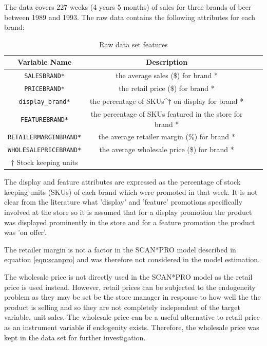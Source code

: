 \documentclass[a4paper,11pt]{article}
\begin{document}
The data covers 227 weeks (4 years 5 months) of sales for three brands of beer between 1989 and 1993. The raw data contains the following attributes for each brand:

\begin{table}[htb]
 \centering
 \caption{Raw data set features}\label{tab:data_features}
 \begin{tabular}{cccc}
 \toprule
  Variable Name & Description \\
  \midrule
  \texttt{SALESBRAND*}& the average sales (\$) for brand * \\
  \texttt{PRICEBRAND*}	& the retail price (\$) for brand * \\
  \texttt{display\_brand*}	& the percentage of SKUs^{$\dagger$} on display for brand * \\
  \texttt{FEATUREBRAND*}	& the percentage of SKUs featured in the store for brand * \\
  \texttt{RETAILERMARGINBRAND*} & the average retailer margin (\%) for brand * \\
  \texttt{WHOLESALEPRICEBRAND*} & the average wholesale price (\$) for brand * \\
  \bottomrule
  $\dagger$ Stock keeping units
  
 \end{tabular}
\end{table}

The display and feature attributes are expressed as the percentage of stock keeping units (SKUs) of each brand which were promoted in that week. It is not clear from the literature \citep{srinivasan_promotions_2004} what 'display' and 'feature' promotions specifically involved at the store so it is assumed that for a display promotion the product was displayed prominently in the store and for a feature promotion the product was 'on offer'. 

The retailer margin is not a factor in the SCAN*PRO model described in equation \ref{eqn:scanpro} and was therefore not considered in the model estimation.

The wholesale price is not directly used in the SCAN*PRO model as the retail price is used instead. However, retail prices can be subjected to the endogeneity problem as they may be set be the store manager in response to how well the the product is selling and so they are not completely independent of the target variable, unit sales. The wholesale price can be a useful alternative to retail price as an instrument variable if endogenity exists. Therefore, the wholesale price was kept in the data set for further investigation.
\end{document}
